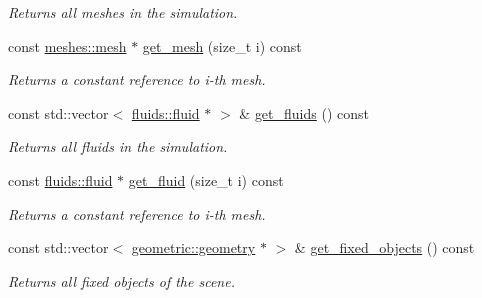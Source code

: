 \begin{DoxyCompactItemize}
\begin{DoxyCompactList}\small\item\em Returns all meshes in the simulation. \end{DoxyCompactList}\item 
\mbox{\label{classphysim_1_1simulator_a04a83acd2135ea5a20c5374cd823224b}} 
const \hyperlink{classphysim_1_1meshes_1_1mesh}{meshes\+::mesh} $\ast$ \hyperlink{classphysim_1_1simulator_a04a83acd2135ea5a20c5374cd823224b}{get\+\_\+mesh} (size\+\_\+t i) const
\begin{DoxyCompactList}\small\item\em Returns a constant reference to i-\/th mesh. \end{DoxyCompactList}\item 
const std\+::vector$<$ \hyperlink{classphysim_1_1fluids_1_1fluid}{fluids\+::fluid} $\ast$ $>$ \& \hyperlink{classphysim_1_1simulator_a65b91f351c9e2164c0e6bd46cdc0a431}{get\+\_\+fluids} () const
\begin{DoxyCompactList}\small\item\em Returns all fluids in the simulation. \end{DoxyCompactList}\item 
\mbox{\label{classphysim_1_1simulator_ad202bd47576d65f838e79c043b5f6075}} 
const \hyperlink{classphysim_1_1fluids_1_1fluid}{fluids\+::fluid} $\ast$ \hyperlink{classphysim_1_1simulator_ad202bd47576d65f838e79c043b5f6075}{get\+\_\+fluid} (size\+\_\+t i) const
\begin{DoxyCompactList}\small\item\em Returns a constant reference to i-\/th mesh. \end{DoxyCompactList}\item 
\mbox{\label{classphysim_1_1simulator_aefd663a9132dd6f500ff0fb8b1c8984a}} 
const std\+::vector$<$ \hyperlink{classphysim_1_1geometric_1_1geometry}{geometric\+::geometry} $\ast$ $>$ \& \hyperlink{classphysim_1_1simulator_aefd663a9132dd6f500ff0fb8b1c8984a}{get\+\_\+fixed\+\_\+objects} () const
\begin{DoxyCompactList}\small\item\em Returns all fixed objects of the scene. \end{DoxyCompactList}\item 
\mbox{\label{classphysim_1_1simulator_a06c09c9b7d44dd817a8e8fb39665289f}} 

\end{DoxyCompactItemize}
